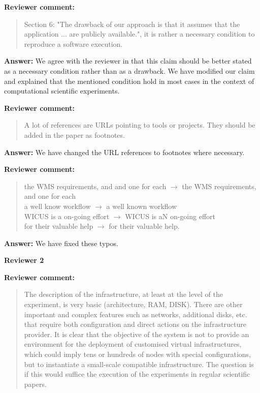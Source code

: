 \documentclass{letter}
\newenvironment{review}%
{\textbf{Reviewer comment:}\begin{quote}}%
{\end{quote}}%
\newcommand{\answer}[1]{%
      \textbf{Answer:} #1}
\begin{document}
\begin{letter}{}
\begin{review}
Section 6: "The drawback of our approach is that it assumes that the application ...  are publicly available.", it is rather a necessary condition to reproduce a software execution.
\end{review}

\answer{We agree with the reviewer in that this claim should be better stated as a necessary condition rather than as a drawback. We have modified our claim and explained that the mentioned condition hold in most cases in the context of computational scientific experiments. }


\begin{review}
A lot of references are URLs pointing to tools or projects. They should be added in the paper as footnotes.
\end{review}

\answer{We have changed the URL references to footnotes where necessary.}


\begin{review}
the WMS requirements, and and one for each $\rightarrow$ the WMS requirements, and one for each \\
a well know workflow $\rightarrow$ a well known workflow \\
WICUS is a on-going effort $\rightarrow$ WICUS is aN on-going effort \\
for their valuable help $\rightarrow$ for their valuable help.
\end{review}

\answer{We have fixed these typos.}



\newpage

%
%
\textbf{Reviewer 2}


\begin{review}
The description of the infrastructure, at least at the level of the experiment, is very basic (architecture, RAM, DISK). There are other important and complex features such as networks, additional disks, etc. that require both configuration and direct actions on the infrastructure provider. It is clear that the objective of the system is not to provide an environment for the deployment of customised virtual infrastructures, which could imply tens or hundreds of nodes with special configurations, but to instantiate a small-scale compatible infrastructure. The question is if this would suffice the execution of the experiments in regular scientific papers.
\end{review}


\end{letter}
\end{document}
